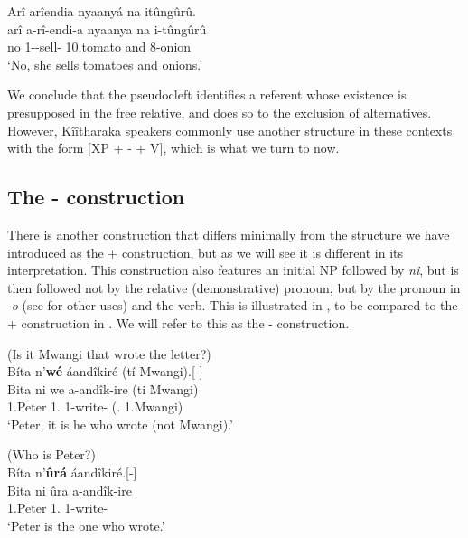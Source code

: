 \documentclass[output=paper]{langscibook}
\begin{document}
\z

\ea
Arî arîendia nyaanyá na itûngûrû.\\
\gll
arî  a-rî-endi-a  nyaanya  na  i-tûngûrû\\
no 1\SM{}-\PRS{}-sell-\FV{} 10.tomato  and  8-onion\\
\glt
‘No, she sells tomatoes and onions.’

\z


We conclude that the pseudocleft identifies a referent whose existence is presupposed in the free relative, and does so to the exclusion of alternatives. However, Kîîtharaka speakers commonly use another structure in these contexts with the form [XP + \NI-\PRO{} + V], which is what we turn to now.

\subsection{The \NI-\PRO{} construction}
\label{bkm:Ref116891458}\label{bkm:Ref111801991}\label{bkm:Ref116898052}
There is another construction that differs minimally from the structure we have introduced as the \NI+\RM{} construction, but as we will see it is different in its interpretation. This construction also features an initial NP followed by \textit{ni}, but is then followed not by the relative (demonstrative) pronoun, but by the pronoun in -\textit{o} (see  for other uses) and the verb. This is illustrated in , to be compared to the \NI+\RM{} construction in . We will refer to this as the \NI-\PRO{} construction.

\eanoraggedright
\label{bkm:Ref111713731}
(Is it Mwangi that wrote the letter?)\\
Bíta n’\textbf{wé} áandîkiré (tí Mwangi).\hfill\hbox{[\NI-\PRO{}]}\\
\gll
Bita  ni we a-andîk-ire  (ti  Mwangi)\\
1.Peter \FOC{}  1.\PRO{} 1\SM{}-write-\PFV{} (\NEG.\COP{} 1.Mwangi)\\
\glt
‘Peter, it is he who wrote (not Mwangi).’



\ex
\label{bkm:Ref116898341}
(Who is Peter?)\\
Bíta n’\textbf{ûrá} áandîkiré.\hfill\hbox{[\NI-\RM{}]}\\
\gll
Bita  ni ûra a-andîk-ire\\
1.Peter \FOC{} 1.\RM{} 1\SM{}-write-\PFV{}\\
\glt
‘Peter is the one who wrote.’
\end{document}

